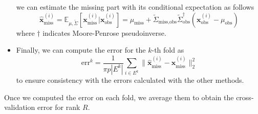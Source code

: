 \documentclass{article}
\begin{document}
\begin{itemize}
$$	$$
	we can estimate the missing part with its conditional expectation  as follows 
	\begin{equation}
	\hat{\textbf{x}}^{(i)}_\text{miss} = \mathbb{E}_{\mu,\tilde{\Sigma}} \left[ \textbf{x}^{(i)}_\text{miss} | \textbf{x}^{(i)}_\text{obs} \right] = \mu_\text{miss} + \tilde{\Sigma}_{\text{miss,obs}} \tilde{\Sigma}_{\text{obs}}^{\dag} \left( \textbf{x}^{(i)}_\text{obs} - \mu_\text{obs} \right)
	\label{eq:condexp}
	\end{equation}
	where $\dag$  indicates Moore-Penrose pseudoinverse.
	\item Finally, we can compute the error for the $k$-th fold as 
	$$
	\text{err}^k = \frac{1}{\pi p|E^k|}\sum_{i \in E^k} \| \hat{\textbf{x}}^{(i)}_\text{miss} - \textbf{x}^{(i)}_\text{miss} \|_2^2
	$$
	to ensure consistency with the errors calculated with the other methods.
\end{itemize}
Once we computed the error on each fold, we average them to obtain the cross-validation error for rank $R$.
\end{document}

